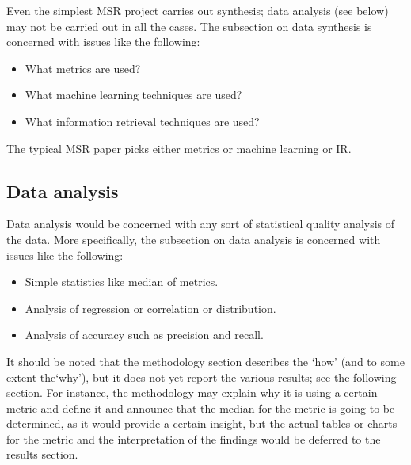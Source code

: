 \documentclass{llncs}
\begin{document}
Even the simplest MSR project carries out synthesis; data analysis (see
below) may not be carried out in all the cases. The subsection on data
synthesis is concerned with issues like the following:

\begin{itemize}

\item What metrics are used?

\item What machine learning techniques are used?

\item What information retrieval techniques are used?

\end{itemize}

The typical MSR paper picks either metrics or machine learning or IR.

\subsection{Data analysis}

Data analysis would be concerned with any sort of statistical quality
analysis of the data. More specifically, the subsection on data
analysis is concerned with issues like the following:

\begin{itemize}

\item Simple statistics like median of metrics.

\item Analysis of regression or correlation or distribution.

\item Analysis of accuracy such as precision and recall.

\end{itemize}

It should be noted that the methodology section describes the `how'
(and to some extent the`why'), but it does not yet report the various
results; see the following section. For instance, the methodology may
explain why it is using a certain metric and define it and announce
that the median for the metric is going to be determined, as it would
provide a certain insight, but the actual tables or charts for the
metric and the interpretation of the findings would be deferred to the
results section.

\end{document}
